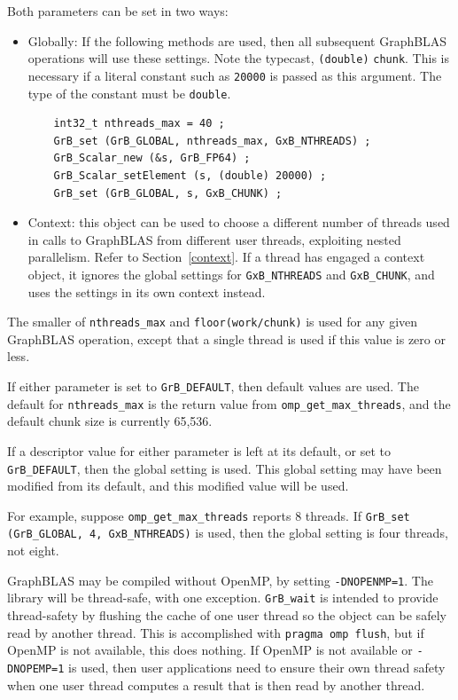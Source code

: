 Both parameters can be set in two ways:

\begin{itemize}

\item Globally:  If the following methods are used, then all subsequent
GraphBLAS operations will use these settings.  Note the typecast,
\verb'(double)' \verb'chunk'.  This is necessary if a literal constant such as
\verb'20000' is passed as this argument.  The type of the constant must be
\verb'double'.

    {\footnotesize
    \begin{verbatim}
    int32_t nthreads_max = 40 ;
    GrB_set (GrB_GLOBAL, nthreads_max, GxB_NTHREADS) ;
    GrB_Scalar_new (&s, GrB_FP64) ;
    GrB_Scalar_setElement (s, (double) 20000) ;
    GrB_set (GrB_GLOBAL, s, GxB_CHUNK) ; \end{verbatim} }

\item Context: this object can be used to choose a different number of
threads used in calls to GraphBLAS from different user threads, exploiting
nested parallelism.  Refer to Section~\ref{context}.  If a thread has engaged a
context object, it ignores the global settings for \verb'GxB_NTHREADS' and
\verb'GxB_CHUNK', and uses the settings in its own context instead.

\end{itemize}

The smaller of \verb'nthreads_max' and \verb'floor(work/chunk)' is used for any
given GraphBLAS operation, except that a single thread is used if this value is
zero or less.

If either parameter is set to \verb'GrB_DEFAULT', then default values are used.
The default for \verb'nthreads_max' is the return value from
\verb'omp_get_max_threads', and the default chunk size is currently 65,536.

If a descriptor value for either parameter is left at its default, or set to
\verb'GrB_DEFAULT', then the global setting is used.  This global setting may
have been modified from its default, and this modified value will be used.

For example, suppose \verb'omp_get_max_threads' reports 8 threads.  If \newline
\verb'GrB_set (GrB_GLOBAL, 4, GxB_NTHREADS)' is used, then the global setting is four
threads, not eight.

GraphBLAS may be compiled without OpenMP, by setting \verb'-DNOPENMP=1'.
The library will be thread-safe, with one exception.  \verb'GrB_wait' is
intended to provide thread-safety by flushing the cache of one user thread
so the object can be safely read by another thread.  This is accomplished
with \verb'pragma omp flush', but if OpenMP is not available, this does
nothing.  If OpenMP is not available or \verb'-DNOPEMP=1' is used, then
user applications need to ensure their own thread safety when one user thread
computes a result that is then read by another thread.

